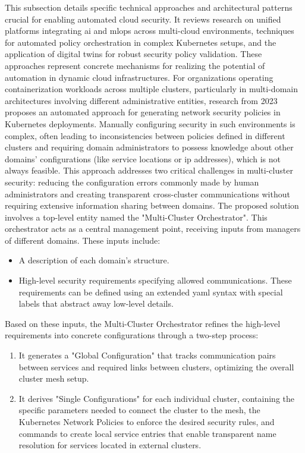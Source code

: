 This subsection details specific technical approaches and architectural patterns crucial for enabling automated cloud security. It reviews research on unified platforms integrating \gls{ai} and \gls{mlops} across \gls{multi-cloud} environments, techniques for automated policy orchestration in complex Kubernetes setups, and the application of digital twins for robust security policy validation. These approaches represent concrete mechanisms for realizing the potential of automation in dynamic cloud infrastructures.
For organizations operating \gls{containerization} workloads across multiple clusters, particularly in multi-domain architectures involving different administrative entities, research from 2023 proposes an automated approach for generating network security policies in Kubernetes deployments\cite{bringhenti_security_2023}. Manually configuring security in such environments is complex, often leading to inconsistencies between policies defined in different clusters and requiring domain administrators to possess knowledge about other domains' configurations (like service locations or \gls{ip} addresses), which is not always feasible\cite{bringhenti_security_2023}. This approach addresses two critical challenges in multi-cluster security: reducing the configuration errors commonly made by human administrators and creating transparent cross-cluster communications without requiring extensive information sharing between domains\cite{bringhenti_security_2023}. The proposed solution involves a top-level entity named the "Multi-Cluster Orchestrator"\cite{bringhenti_security_2023}. This orchestrator acts as a central management point, receiving inputs from managers of different domains\cite{bringhenti_security_2023}. These inputs include:
\begin{itemize}
\item A description of each domain's structure\cite{bringhenti_security_2023}.
\item High-level security requirements specifying allowed communications\cite{bringhenti_security_2023}. These requirements can be defined using an extended \gls{yaml} syntax with special labels that abstract away low-level details\cite{bringhenti_security_2023}.
\end{itemize}
Based on these inputs, the Multi-Cluster Orchestrator refines the high-level requirements into concrete configurations through a two-step process\cite{bringhenti_security_2023}:
\begin{enumerate}
\item It generates a "Global Configuration" that tracks communication pairs between services and required links between clusters, optimizing the overall cluster mesh setup\cite{bringhenti_security_2023}.
\item It derives "Single Configurations" for each individual cluster, containing the specific parameters needed to connect the cluster to the mesh, the Kubernetes Network Policies to enforce the desired security rules, and commands to create local service entries that enable transparent name resolution for services located in external clusters\cite{bringhenti_security_2023}.
\end{enumerate}
